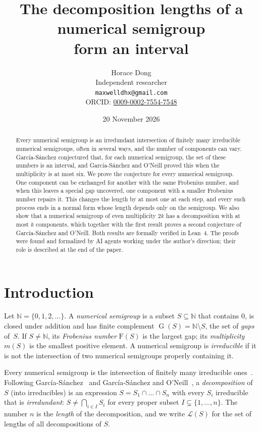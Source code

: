 \documentclass[11pt]{article}
\title{The decomposition lengths of a numerical semigroup\\ form an interval}
\author{Horace Dong\\ \small Independent researcher\\
\small\texttt{maxwelldhx@gmail.com}\\
\small ORCID: \href{https://orcid.org/0009-0002-7554-7548}{0009-0002-7554-7548}}
\date{20 November 2026}
\theoremstyle{definition}
\theoremstyle{remark}
\newcommand{\N}{\mathbb N}
\DeclareMathOperator{\G}{G}
\newcommand{\F}{\mathrm F}
\begin{document}
\maketitle

\begin{abstract}
Every numerical semigroup is an irredundant intersection of finitely many
irreducible numerical semigroups, often in several ways, and the number of
components can vary. García-Sánchez conjectured that, for each numerical
semigroup, the set of these numbers is an interval, and García-Sánchez and
O'Neill proved this when the multiplicity is at most six. We prove the
conjecture for every numerical semigroup. One component can be exchanged for
another with the same Frobenius number, and when this leaves a special gap
uncovered, one component with a smaller Frobenius number repairs it. This
changes the length by at most one at each step, and every such process ends in
a normal form whose length depends only on the semigroup. We also show that a
numerical semigroup of even multiplicity $2k$ has a decomposition with at most
$k$ components, which together with the first result proves a second
conjecture of García-Sánchez and O'Neill. Both results are formally verified
in Lean~4. The proofs were found and formalized by AI agents working under the
author's direction; their role is described at the end of the paper.
\end{abstract}

\section{Introduction}

Let $\N=\{0,1,2,\dots\}$. A \emph{numerical semigroup} is a subset
$S\subseteq\N$ that contains $0$, is closed under addition and has finite
complement $\G(S)=\N\setminus S$, the set of \emph{gaps} of~$S$. If
$S\ne\N$, its \emph{Frobenius number} $\F(S)$ is the largest gap; its
\emph{multiplicity} $m(S)$ is the smallest positive element. A numerical
semigroup is \emph{irreducible} if it is not the intersection of two numerical
semigroups properly containing it.

Every numerical semigroup is the intersection of finitely many irreducible
ones~\cite[Chapter~3, Proposition~4.44]{rg}. Following
García-Sánchez~\cite{g} and García-Sánchez and O'Neill~\cite{go}, a
\emph{decomposition} of $S$ (into irreducibles) is an expression
$S=S_1\cap\dots\cap S_n$ with every $S_i$ irreducible that is
\emph{irredundant}: $S\ne\bigcap_{i\in I}S_i$ for every proper subset
$I\subsetneq\{1,\dots,n\}$. The number $n$ is the \emph{length} of the
decomposition, and we write $\mathcal L(S)$ for the set of lengths of all
decompositions of $S$.
\end{document}
